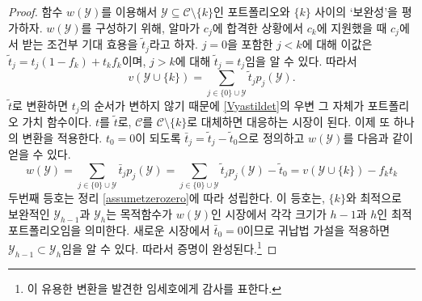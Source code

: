 \documentclass[11pt]{article} %
\newif\ifen
\theoremstyle{definition}
\theoremstyle{definition}
\begin{document}
\begin{proof}
\ifen We will use the function $w(\mathcal{Y})$ to grade portfolios $\mathcal{Y} \subseteq \mathcal{C} \setminus \{k\}$ according to how well they complement $\{k\}$. To construct $w(\mathcal{Y})$, let $\tilde t_j$ denote the expected utility Alma receives from school $c_j$ \emph{given} that she has been admitted to $c_j$ and applied to $c_k$. For $j < k$, including $j = 0$, this is $\tilde t_j = (1- f_k) t_j + f_k t_k$; for $j > k $, this is $\tilde t_j = t_j$. This means that 
\else 함수 $w(\mathcal{Y})$를 이용해서 $\mathcal{Y} \subseteq \mathcal{C} \setminus \{k\}$인 포트폴리오와 $\{k\}$ 사이의 \mbox{`보완성'을} 평가하자. $w(\mathcal{Y})$를 구성하기 위해, 알마가 $c_j$에 합격한 상황에서 $c_k$에 지원했을 때 $c_j$에서 받는 조건부 기대 효용을 $\tilde t_j$라고 하자. $j = 0$을 포함한 $j < k$에 대해 이값은 $\tilde t_j = t_j (1- f_k) + t_k f_k$이며, $j > k $에 대해 $\tilde t_j = t_j$임을 알 수 있다. 따라서 \fi
\begin{equation}\label{Vyastildet}
v(\mathcal{Y}\cup\{k\}) = \sum_{j \in \{0\} \cup \mathcal{Y}} \tilde t_j p_j(\mathcal{Y}).\end{equation}
\ifen The transformation to $\tilde t$ does not change the order of the $t_j$-values. Therefore, the expression on the right side of \eqref{Vyastildet} is itself a portfolio valuation function. In the corresponding market, $t$ is replaced by $\tilde t$ and $\mathcal{C}$ is replaced by $\mathcal{C}\setminus\{k\}$. Now, we obtain $w(\mathcal{Y})$ through one more transformation: Define $\bar t_j = \tilde t_j - \tilde t_0$ so that $t_0 = 0$ and let
\else $\tilde t$로 변환하면 $t_j$의 순서가 변하지 않기 때문에 \eqref{Vyastildet}의 우변 그 자체가 포트폴리오 가치 함수이다. $t$를 $\tilde t$로, $\mathcal{C}$를 $\mathcal{C}\setminus \{k\}$로 대체하면 대응하는 시장이 된다. 이제 또 하나의 변환을 적용한다. $t_0 = 0$이 되도록 $\bar t_j = \tilde t_j - \tilde t_0$으로 정의하고 $w(\mathcal{Y})$를 다음과 같이 얻을 수 있다. \fi
\begin{equation}  \label{wYvXminusconst}
w(\mathcal{Y})
= \sum_{j \in \{0\} \cup \mathcal{Y}} \bar t_j p_j(\mathcal{Y})
= \sum_{j \in \{0\} \cup \mathcal{Y}} \tilde t_j p_j(\mathcal{Y})- \tilde t_0
= v(\mathcal{Y}\cup\{k\}) -  f_k t_k \end{equation}
\ifen where the second equality follows from Theorem \ref{assumetzerozero}. This identity says that the optimal complements to $\{k\}$, given by $\mathcal{Y}_{h-1}$ and $\mathcal{Y}_h$, are themselves optimal portfolios of size $h-1$ and $h$ for the market whose objective function is $w(\mathcal{Y})$. Since $\bar t_0 = 0$ in the latter market, the inductive hypothesis implies that $\mathcal{Y}_{h-1} \subset \mathcal{Y}_h$, which completes the proof.\footnote{We thank Yim Seho for discovering this useful transformation.}
\else 두번째 등호는 정리 \ref{assumetzerozero}에 따라 성립한다. 이 등호는, $\{k\}$와 최적으로 보완적인 $\mathcal{Y}_{h-1}$과 $\mathcal{Y}_h$는 목적함수가 $w(\mathcal{Y})$인 시장에서 각각 크기가 $h-1$과 $h$인 최적 포트폴리오임을 의미한다. 새로운 시장에서 $\bar t_0 = 0$이므로 귀납법 가설을 적용하면 $\mathcal{Y}_{h-1} \subset \mathcal{Y}_h$임을 알 수 있다. 따라서 증명이 완성된다.\footnote{이 유용한 변환을 발견한 임세호에게 감사를 표한다.} \fi
\end{proof}
\end{document}
